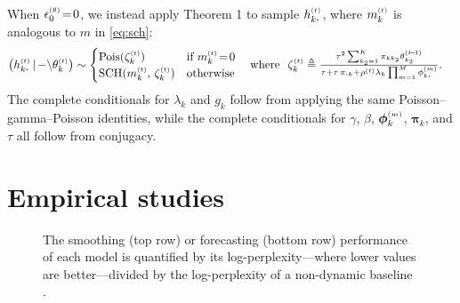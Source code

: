 \documentclass{article}
\begin{document}
When $\epstheta \teq0$, we instead apply Theorem 1 to sample $\hkdt$, where $\mkt$ is analogous to $m$ in \cref{eq:sch}:
%
\begin{align}
\left(\hkdt \given {-\backslash} \thetakt\right) &\sim
\begin{cases}
\textrm{Pois}(\zeta_{k}^{\mathsmaller{(t)}}) &\textrm{if } \mkt \teq 0 \\
%
\textrm{SCH}(\mkt,\, \zeta_{k}^{\mathsmaller{(t)}}) &\textrm{otherwise}
\end{cases}
\hspace{1em}\textrm{where }\,\,
\zeta_{k}^{\mathsmaller{(t)}} \triangleq \mathsmaller{\frac{\tau^2 \sum_{k_2=1}^K \pi_{kk_2} \thetakttm}{\tau + \tau\,\pi_{\bcdot k} + \rhot \lambda_k \prod_{m=1}^M\phi^{\mathsmaller{(m)}}_{k\bcdot }}}.
\end{align}
The complete conditionals for $\lambda_k$ and $g_k$ follow from applying the same Poisson--gamma--Poisson identities, while the complete conditionals for $\gamma$, $\beta$, $\boldsymbol{\phi}^{\mathsmaller{(m)}}_k$, $\boldsymbol{\pi}_{k}$, and $\tau$ all follow from conjugacy.%

\section{Empirical studies}
\label{sec:empirical}
\begin{figure}[t]
\centering
{}\hfill
%
\caption{\label{fig:empirical}\footnotesize The smoothing (top row) or forecasting (bottom row) performance of each model is quantified by its log-perplexity---where lower values are better---divided by the log-perplexity of a non-dynamic baseline \cite{schein2015bayesian}.~}%
\end{figure}
\end{document}

